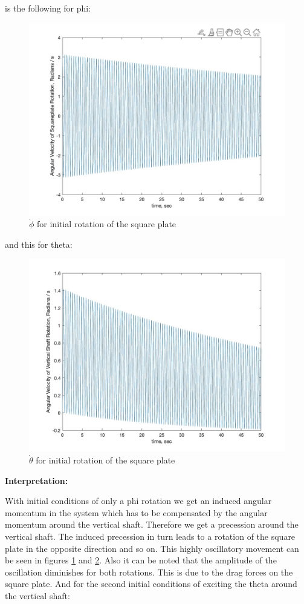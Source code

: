 is the following for phi:
\begin{figure}[ht]
    \centering
    \includegraphics[scale=0.35]{images/phid_case_1.jpg}
    \caption{$\dot\phi$ for initial rotation of the square plate}
    \label{fig:phid_case1}
\end{figure}
\clearpage %
and this for theta:
\begin{figure}[ht]
    \centering
    \includegraphics[scale=0.35]{images/thetad_case_1.jpg}
    \caption{$\dot\theta$ for initial rotation of the square plate}
    \label{fig:thetad_case1}
\end{figure}

\textbf{Interpretation:}

With initial conditions of only a phi rotation we get an induced angular momentum in the system which has to be compensated by the angular momentum around the vertical shaft. Therefore we get a precession around the vertical shaft. The induced precession in turn leads to a rotation of the square plate in the opposite direction and so on. This highly oscillatory movement can be seen in figures \ref{fig:phid_case1} and \ref{fig:thetad_case1}. Also it can be noted that the amplitude of the oscillation diminishes for both rotations. This is due to the drag forces on the square plate.
\clearpage %
And for the second initial conditions of exciting the theta around the vertical shaft:


